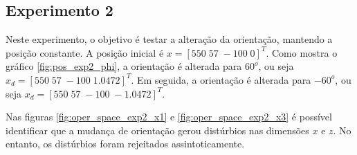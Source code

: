 \subsection{Experimento 2}

Neste experimento, o objetivo é testar a alteração da orientação, mantendo a posição constante. A posição inicial é ${x} =[ 550 \; 57 \; -100 \; 0]^T$. Como mostra o gráfico \ref{fig:pos_exp2_phi}, a orientação é alterada para $60^o$, ou seja ${x_d} =[ 550 \; 57 \; -100 \; 1.0472]^T$. Em seguida, a orientação é alterada para $-60^o$, ou seja ${x_d} =[ 550 \; 57 \; -100 \; -1.0472]^T$. 

Nas figuras \ref{fig:oper_space_exp2_x1} e \ref{fig:oper_space_exp2_x3} é possível identificar que a mudança de orientação gerou distúrbios nas dimensões $x$ e $z$. No entanto, os distúrbios foram rejeitados assintoticamente.

